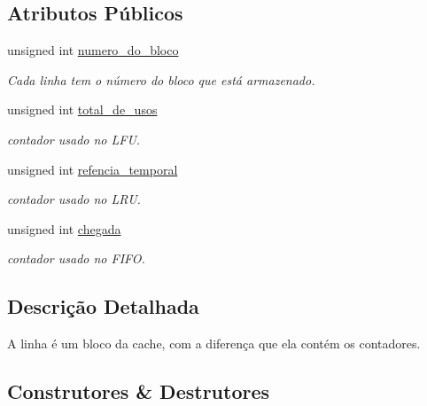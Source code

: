 \subsection*{Atributos Públicos}
\begin{DoxyCompactItemize}
\item 
\mbox{\label{structLinha_ab9ce9d1248c2abd2211539f09d8c6e0a}} 
unsigned int \hyperlink{structLinha_ab9ce9d1248c2abd2211539f09d8c6e0a}{numero\+\_\+do\+\_\+bloco}
\begin{DoxyCompactList}\small\item\em Cada linha tem o número do bloco que está armazenado. \end{DoxyCompactList}\item 
\mbox{\label{structLinha_acb0cf5d63a5ae6a9fd604ef302c053b8}} 
unsigned int \hyperlink{structLinha_acb0cf5d63a5ae6a9fd604ef302c053b8}{total\+\_\+de\+\_\+usos}
\begin{DoxyCompactList}\small\item\em contador usado no L\+FU. \end{DoxyCompactList}\item 
\mbox{\label{structLinha_a645231426689a6887121c3fc916c3bc1}} 
unsigned int \hyperlink{structLinha_a645231426689a6887121c3fc916c3bc1}{refencia\+\_\+temporal}
\begin{DoxyCompactList}\small\item\em contador usado no L\+RU. \end{DoxyCompactList}\item 
\mbox{\label{structLinha_ad08975892e9a9d9a4b2902fbfc7426a3}} 
unsigned int \hyperlink{structLinha_ad08975892e9a9d9a4b2902fbfc7426a3}{chegada}
\begin{DoxyCompactList}\small\item\em contador usado no F\+I\+FO. \end{DoxyCompactList}\end{DoxyCompactItemize}


\subsection{Descrição Detalhada}
A linha é um bloco da cache, com a diferença que ela contém os contadores. 

\subsection{Construtores \& Destrutores}
\mbox{\label{structLinha_a4482bff9f7dc3c59b801b88c9b524f70}} 
